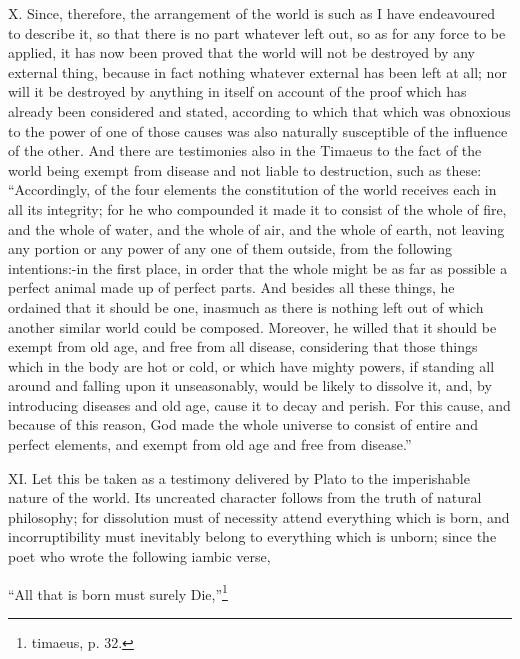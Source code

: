 X. Since, therefore, the arrangement of the world is such as I have endeavoured to describe it, so
that there is no part whatever left out, so as for any force to be applied, it has now been proved
that the world will not be destroyed by any external thing, because in fact nothing whatever external
has been left at all; nor will it be destroyed by anything in itself on account of the proof which has
already been considered and stated, according to which that which was obnoxious to the power of
one of those causes was also naturally susceptible of the influence of the other. And there are
testimonies also in the Timaeus to the fact of the world being exempt from disease and not liable to
destruction, such as these: ``Accordingly, of the four elements the constitution of the world receives
each in all its integrity; for he who compounded it made it to consist of the whole of fire, and the
whole of water, and the whole of air, and the whole of earth, not leaving any portion or any power of
any one of them outside, from the following intentions:-in the first place, in order that the whole
might be as far as possible a perfect animal made up of perfect parts. And besides all these things,
he ordained that it should be one, inasmuch as there is nothing left out of which another similar
world could be composed. Moreover, he willed that it should be exempt from old age, and free from
all disease, considering that those things which in the body are hot or cold, or which have mighty
powers, if standing all around and falling upon it unseasonably, would be likely to dissolve it, and, by
introducing diseases and old age, cause it to decay and perish. For this cause, and because of
this reason, God made the whole universe to consist of entire and perfect elements, and exempt
from old age and free from disease.''

XI. Let this be taken as a testimony delivered by Plato to the imperishable nature of the world. Its
uncreated character follows from the truth of natural philosophy; for dissolution must of necessity
attend everything which is born, and incorruptibility must inevitably belong to everything which is
unborn; since the poet who wrote the following iambic verse,

``All that is born must surely Die,''\footnote{timaeus, p. 32.}

